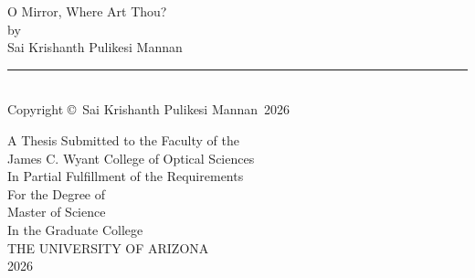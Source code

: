 \documentclass[12pt]{report} %
\newcommand{\CompleteTitle}{O Mirror, Where Art Thou?} %
\newcommand{\FullName}{Sai Krishanth Pulikesi Mannan} %
\newcommand{\DegreeType}{Master of Science} %
\newcommand{\DepartmentName}{James C. Wyant College of Optical Sciences} %
\newcommand{\DegreeYear}{2026} %
\begin{document}
\nobibliography* %



\thispagestyle{empty} %

\null
\vfill

\begin{center}
\MakeUppercase\CompleteTitle \\ 
\vspace*{1.5em}
by\\
\vspace*{1.5em}
\FullName \\
\vspace*{2em}

\rule{3in}{1pt}\\
\vspace*{-1em}
{\small Copyright \copyright\ \FullName\ \DegreeYear} \\
\vspace*{2em}

A Thesis Submitted to the Faculty of the\\
\vspace*{1.5em}
\MakeUppercase\DepartmentName \\
\vspace*{1.5em}
In Partial Fulfillment of the Requirements\\
\vspace*{0.5em}
For the Degree of\\
\vspace*{1.5em}
\MakeUppercase\DegreeType \\
\vspace*{1.5em}
In the Graduate College\\
\vspace*{1.5em}
THE UNIVERSITY OF ARIZONA\\
\vspace*{3em}
\DegreeYear
\end{center}

\vfill %





\end{document}
